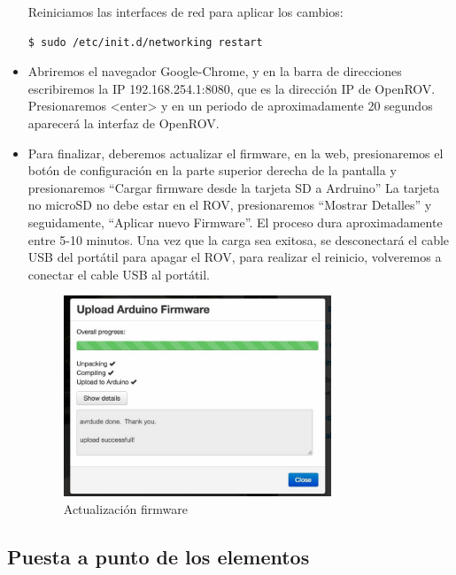\begin{itemize}
\subitem Reiniciamos las interfaces de red para aplicar los cambios:

\renewcommand{\lstlistingname}{}
\begin{lstlisting}[caption=Reinicio, label={lst:reset}]
  $ sudo /etc/init.d/networking restart
\end{lstlisting}
\item Abriremos el navegador Google-Chrome, y en la barra de direcciones escribiremos la IP 192.168.254.1:8080, que es la dirección IP de OpenROV. Presionaremos <enter> y en un periodo de aproximadamente 20 segundos aparecerá la interfaz de OpenROV.
\item Para finalizar, deberemos actualizar el firmware, en la web, presionaremos el botón de configuración en la parte superior derecha de la pantalla y presionaremos “Cargar firmware desde la tarjeta SD a Ardruino”
La tarjeta no microSD no debe estar en el ROV, presionaremos “Mostrar Detalles” y seguidamente, “Aplicar nuevo Firmware”.
El proceso dura aproximadamente entre 5-10 minutos.
Una vez que la carga sea exitosa, se desconectará el cable USB del portátil para apagar el ROV, para realizar el reinicio, volveremos a conectar el cable USB al portátil.


\begin{figure} [hbtp]
\begin{center}
  \includegraphics[width=8cm]{img/cap3/3_4/firmware}
\end{center}
\caption{Actualización firmware}
\label{fig:firmware}
\end{figure}

\end{itemize}
  
  
  
\subsection{Puesta a punto de los elementos}
\label{subsec:elementos}

